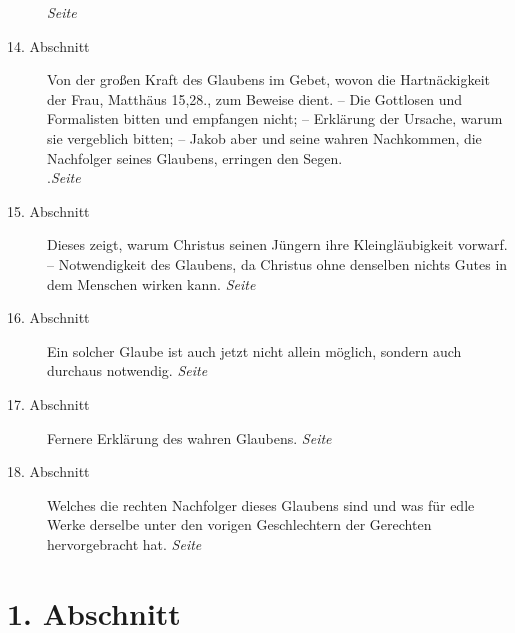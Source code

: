 \begin{description}
\dotfill \textit{Seite~\pageref{kap6_ab13}}\\
\item[14. Abschnitt] Von der großen Kraft des Glaubens im Gebet, wovon die
Hartnäckigkeit
der Frau, Matthäus 15,28., zum Beweise dient. -- Die Gottlosen
und Formalisten bitten und empfangen nicht; -- Erklärung der Ursache, warum sie
vergeblich bitten; -- Jakob aber und seine wahren Nachkommen, die Nachfolger
seines Glaubens, erringen
den Segen.\\
.\dotfill \textit{Seite~\pageref{kap6_ab14}}\\
\item[15. Abschnitt] Dieses zeigt, warum Christus seinen Jüngern ihre
Kleingläubigkeit vorwarf. -- Notwendigkeit des Glaubens, da Christus ohne
denselben nichts Gutes in dem Menschen wirken kann.
\dotfill \textit{Seite~\pageref{kap6_ab15}}\\
\item[16. Abschnitt] Ein solcher Glaube ist auch jetzt nicht allein möglich,
sondern auch durchaus notwendig.
\dotfill \textit{Seite~\pageref{kap6_ab16}}\\
\item[17. Abschnitt] Fernere Erklärung des wahren Glaubens.
\dotfill \textit{Seite~\pageref{kap6_ab17}}\\
\item[18. Abschnitt] Welches die rechten Nachfolger dieses Glaubens sind und
was für edle Werke derselbe unter den vorigen Geschlechtern der Gerechten
hervorgebracht hat.
\dotfill \textit{Seite~\pageref{kap6_ab18}}\\

\end{description}

\newpage

\section{1. Abschnitt} \label{kap6_ab1}

